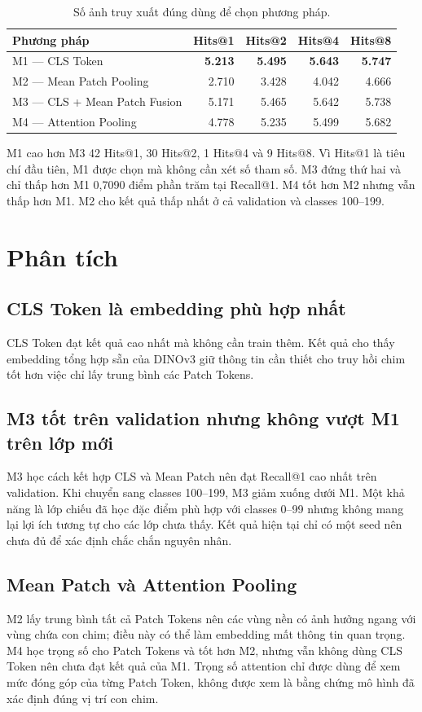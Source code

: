 \documentclass[11pt,a4paper]{article}
\begin{document}
\begin{table}[htbp]
\centering
\caption{Số ảnh truy xuất đúng dùng để chọn phương pháp.}
\begin{tabular}{@{}lrrrr@{}}
\toprule
Phương pháp & Hits@1 & Hits@2 & Hits@4 & Hits@8\\
\midrule
M1 --- CLS Token & \textbf{5.213} & \textbf{5.495} & \textbf{5.643} & \textbf{5.747}\\
M2 --- Mean Patch Pooling & 2.710 & 3.428 & 4.042 & 4.666\\
M3 --- CLS + Mean Patch Fusion & 5.171 & 5.465 & 5.642 & 5.738\\
M4 --- Attention Pooling & 4.778 & 5.235 & 5.499 & 5.682\\
\bottomrule
\end{tabular}
\end{table}

M1 cao hơn M3 42 Hits@1, 30 Hits@2, 1 Hits@4 và 9 Hits@8. Vì Hits@1 là
tiêu chí đầu tiên, M1 được chọn mà không cần xét số tham số. M3 đứng thứ hai
và chỉ thấp hơn M1 0,7090 điểm phần trăm tại Recall@1. M4 tốt hơn M2 nhưng
vẫn thấp hơn M1. M2 cho kết quả thấp nhất ở cả validation và classes
100--199.

\section{Phân tích}
\subsection{CLS Token là embedding phù hợp nhất}
CLS Token đạt kết quả cao nhất mà không cần train thêm. Kết quả cho thấy
embedding tổng hợp sẵn của DINOv3 giữ thông tin cần thiết cho truy hồi chim
tốt hơn việc chỉ lấy trung bình các Patch Tokens.

\subsection{M3 tốt trên validation nhưng không vượt M1 trên lớp mới}
M3 học cách kết hợp CLS và Mean Patch nên đạt Recall@1 cao nhất trên
validation. Khi chuyển sang classes 100--199, M3 giảm xuống dưới M1. Một khả
năng là lớp chiếu đã học đặc điểm phù hợp với classes 0--99 nhưng không mang
lại lợi ích tương tự cho các lớp chưa thấy. Kết quả hiện tại chỉ có một seed
nên chưa đủ để xác định chắc chắn nguyên nhân.

\subsection{Mean Patch và Attention Pooling}
M2 lấy trung bình tất cả Patch Tokens nên các vùng nền có ảnh hưởng ngang với
vùng chứa con chim; điều này có thể làm embedding mất thông tin quan trọng.
M4 học trọng số cho Patch Tokens và tốt hơn M2, nhưng vẫn không dùng CLS Token
nên chưa đạt kết quả của M1. Trọng số attention chỉ được dùng để xem mức đóng
góp của từng Patch Token, không được xem là bằng chứng mô hình đã xác định đúng
vị trí con chim.
\end{document}
